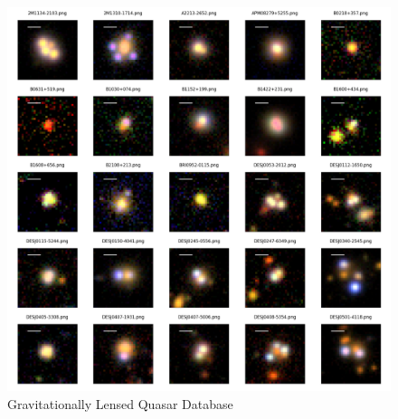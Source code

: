\documentclass{beamer}
\begin{document}
\begin{frame}
\begin{columns}
        \begin{figure}
            \centering
            \includegraphics[width=1.0\textwidth]{../../figs/lensed_quasars.png}
            \caption{Gravitationally Lensed Quasar Database}
        \end{figure}
    \end{columns}


\end{frame}
\end{document}
